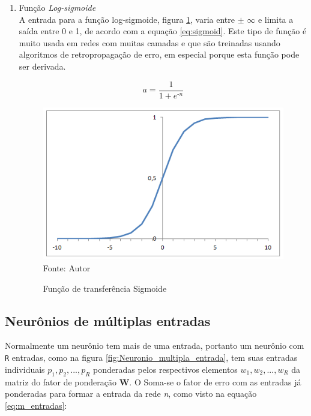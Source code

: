 \documentclass[
	12pt,				%
    oneside,			%
	a4paper,			%
	english,			%
	french,				%
	spanish,			%
	brazil,				%
	]{abntex2}
\begin{document}
\begin{enumerate}
  \item Função \textit{Log-sigmoide}\\
  A entrada para a função log-sigmoide, figura \ref{fig:Sigmoid}, varia entre $\pm$  $\infty$ e limita a saída entre 0 e 1, de acordo com a equação \ref{eq:sigmoid}. Este tipo de função é muito usada em redes com muitas camadas e que são treinadas usando algoritmos de retropropagação de erro, em especial porque esta função pode ser derivada.
  
  
  \begin{equation}
    a = \frac{1}{1+\textit{$e^\textit{-n}$}}
    \label{eq:sigmoid}
  \end{equation}
  
  \begin{figure}[H]
    \centering
    \caption{Função de transferência Sigmoide}
    \includegraphics[scale=0.75]{Sigmoid}\\
    Fonte: Autor\hfill
    \label{fig:Sigmoid}
\end{figure}
  
\end{enumerate}


\subsection {Neurônios de múltiplas entradas}

Normalmente um neurônio tem mais de uma entrada, portanto um neurônio com \texttt{R} entradas, como na figura \ref{fig:Neuronio_multipla_entrada}, tem suas entradas individuais \textit{\(p_1, p_2,...,p_R \)}  ponderadas pelos respectivos elementos \textit{\(w_1, w_2,...,w_R \)} da matriz do fator de ponderação \textbf{W}. O Soma-se o fator de erro com as entradas já ponderadas para formar a entrada da rede \textit{n}, como visto na equação \ref{eq:m_entradas}: 
\end{document}
